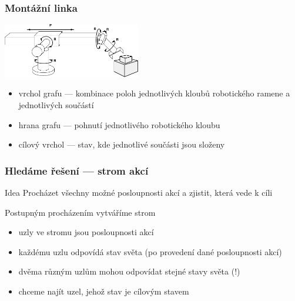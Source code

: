 \documentclass[red,professionalfont]{beamer}
\theoremstyle{definition}
\newcommand{\0}{\mbox{${\bf 0}$}}
\begin{document}
\begin{frame}\frametitle{Montážní linka}
\begin{center}
 \includegraphics[width=6cm]{montazni-linka.pdf}
\end{center}\pause
\begin{itemize}
 \item vrchol grafu \pause --- kombinace poloh jednotlivých kloubů robotického ramene a jednotlivých součástí\pause
 \item hrana grafu \pause --- pohnutí jednotlivého robotického kloubu\pause
 \item cílový vrchol \pause --- stav, kde jednotlivé součásti jsou složeny
\end{itemize}
\end{frame}

\begin{frame}[fragile]\frametitle{Hledáme řešení --- strom akcí}
\begin{block}{Idea}
Procházet všechny možné posloupnosti akcí a zjistit, která vede k cíli
\end{block}\pause
Postupným procházením vytváříme strom\pause
\begin{itemize}
 \item uzly ve stromu jsou posloupnosti akcí \pause
 \item každému uzlu odpovídá stav světa (po provedení dané posloupnosti akcí)\pause
 \item [] dvěma různým uzlům mohou odpovídat stejné stavy světa (!)\pause
 \item chceme najít uzel, jehož stav je cílovým stavem
\end{itemize}
\end{frame}
\end{document}
